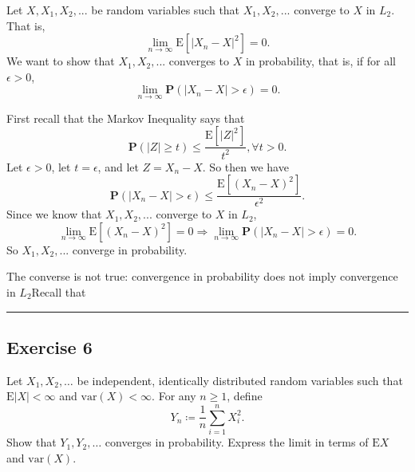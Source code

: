 \documentclass{article}
\theoremstyle{break}
\renewenvironment{proof}{{\bf Proof:}}{\hfill\rule{2mm}{2mm}}
\newcommand{\E}{\mathrm{E}}
\renewcommand{\P}{\mathbf{P}}
\begin{document}
\begin{proof}
  Let $X, X_1, X_2, ...$ be random variables such that $X_1, X_2, ...$ converge to $X$ in $L_2$. That is,
  \[
    \lim_{n \rightarrow \infty} \E[ |X_n - X|^2] = 0.
  \]
  We want to show that $X_1, X_2, ...$ converges to $X$ in probability, that is, if for all $\epsilon > 0$,
  \[
    \lim_{n \rightarrow \infty} \P(|X_n - X| > \epsilon) = 0.
  \]

  First recall that the Markov Inequality says that
  \[
    \P(|Z| \geq t) \leq \frac{\E[|Z|^2]}{t^2}, \forall t > 0.
  \]
  Let $\epsilon > 0$, let $t = \epsilon$, and let $Z = X_n - X$. So then we have
  \[
    \P(|X_n - X| > \epsilon) \leq \frac{\E[(X_n - X)^2]}{\epsilon^2}.
  \]
  Since we know that $X_1, X_2, ...$ converge to $X$ in $L_2$,
  \[
    \lim_{n \rightarrow \infty} \E[(X_n - X)^2] = 0 \Rightarrow \lim_{n \rightarrow \infty} \P(|X_n - X| > \epsilon) = 0.
  \]
  So $X_1, X_2, ...$ converge in probability.

  The converse is not true: convergence in probability does not imply convergence in $L_2$Recall that

\end{proof}

\subsection*{Exercise 6}


Let $X_{1},X_{2},\ldots$ be independent, identically distributed random variables such that $\E|X|<\infty$ and $\mathrm{var}(X)<\infty$.  For any $n\geq1$, define
\[Y_{n}\coloneqq\frac{1}{n}\sum_{i=1}^{n}X_{i}^{2}.\]
Show that $Y_{1},Y_{2},\ldots$ converges in probability.  Express the limit in terms of $\E X$ and $\mathrm{var}(X)$.
\end{document}
